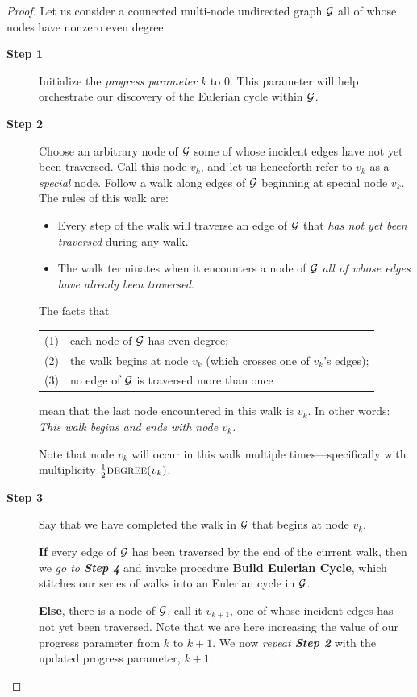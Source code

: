 \begin{proof}
Let us consider a connected multi-node undirected graph $\mbox{$\cal G$}$ all of
whose nodes have nonzero even degree.
\begin{description}
\item[{\bf Step 1}]
Initialize the {\it progress parameter} $k$ to $0$.  This parameter
will help orchestrate our discovery of the Eulerian cycle within $\mbox{$\cal G$}$.

\item[{\bf Step 2}]
Choose an arbitrary node of $\mbox{$\cal G$}$ some of whose incident edges have not
yet been traversed.  Call this node $v_k$, and let us henceforth refer
to $v_k$ as a {\em special} node.  Follow a walk along edges of $\mbox{$\cal G$}$
beginning at special node $v_k$.  The rules of this walk are:
  \begin{itemize}
  \item
Every step of the walk will traverse an edge of $\mbox{$\cal G$}$ that {\em has not
  yet been traversed} during any walk.
  \item
The walk terminates when it encounters a node of $\mbox{$\cal G$}$ {\em all of
  whose edges have already been traversed}.
  \end{itemize}
The facts that 

\hspace*{.25in}\begin{tabular}{ll}
(1) & each node of $\mbox{$\cal G$}$ has even degree; \\
(2) & the walk begins at node $v_k$ (which crosses one of $v_k$'s edges); \\
(3) & no edge of $\mbox{$\cal G$}$ is traversed more than once
\end{tabular}

\noindent
mean that the last node encountered in this walk is $v_k$.  In other
words: {\em This walk begins and ends with node $v_k$.}

Note that node $v_k$ will occur in this walk multiple
times---specifically with multiplicity $\frac{1}{2} \mbox{\sc
  degree}(v_k)$.

\item[{\bf Step 3}]
Say that we have completed the walk in $\mbox{$\cal G$}$ that begins at node $v_k$.

\smallskip

{\bf If} every edge of $\mbox{$\cal G$}$ has been traversed by the end of the
current walk, then we {\it go to {\bf Step 4}} and invoke procedure
{\bf Build Eulerian Cycle}, which stitches our series of walks into an
Eulerian cycle in $\mbox{$\cal G$}$.

\smallskip

{\bf Else}, there is a node of $\mbox{$\cal G$}$, call it $v_{k+1}$, one of whose
incident edges has not yet been traversed.  Note that we are here
increasing the value of our progress parameter from $k$ to $k+1$.  We
now {\it repeat {\bf Step 2}} with the updated progress parameter,
$k+1$.


\end{description}
\end{proof}
